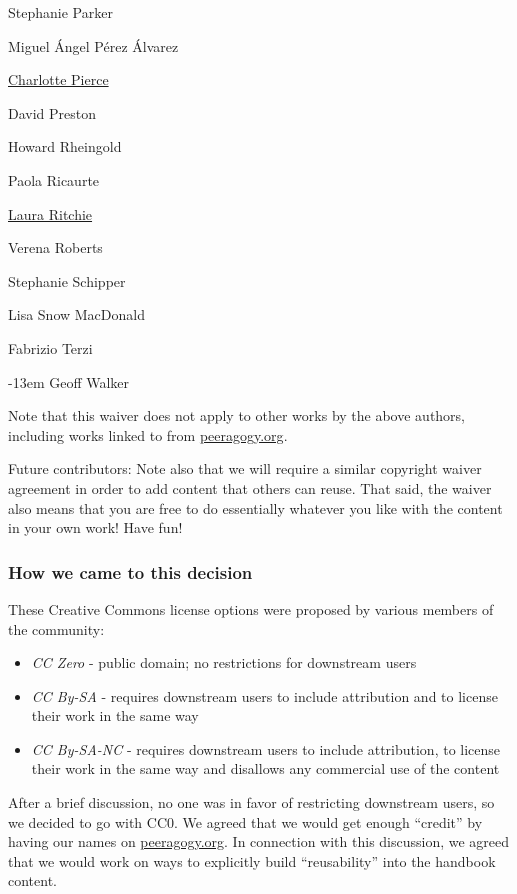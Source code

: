 \begin{commalist}[before=\itshape,font=\normalfont]
  Stephanie Parker
\item
  Miguel Ángel Pérez Álvarez
\item
  \href{http://piercepress.com}{Charlotte Pierce}
\item
  David Preston
\item
  Howard Rheingold
\item
  Paola Ricaurte
\item
  \href{http://www.lauraritchie.com/}{Laura Ritchie}
\item
  Verena Roberts
\item
  Stephanie Schipper
\item
  Lisa Snow MacDonald
\item
  Fabrizio Terzi
\item[\kern-13em]
  Geoff Walker
\end{commalist}

Note that this waiver does not apply to other works by the above
authors, including works linked to from
\href{http://peeragogy.org}{peeragogy.org}.

Future contributors: Note also that we will require a similar
copyright waiver agreement in order to add content that others can
reuse.  That said, the waiver also means that you are free to do
essentially whatever you like with the content in your own work!  Have
fun!

\subsubsection{How we came to this
decision}\label{how-we-came-to-this-decision}

These Creative Commons license options were proposed by various members
of the community:

\begin{itemize}
\itemsep1pt\parskip0pt
\item
  \emph{CC Zero} - public domain; no restrictions for downstream users
\item
  \emph{CC By-SA} - requires downstream users to include attribution and
  to license their work in the same way
\item
  \emph{CC By-SA-NC} - requires downstream users to include attribution,
  to license their work in the same way and disallows any commercial use
  of the content
\end{itemize}

After a brief discussion, no one was in favor of restricting downstream
users, so we decided to go with CC0. We agreed that we would get enough
``credit'' by having our names on
\href{http://peeragogy.org/}{peeragogy.org}. In connection with this
discussion, we agreed that we would work on ways to explicitly build
``reusability'' into the handbook content.
